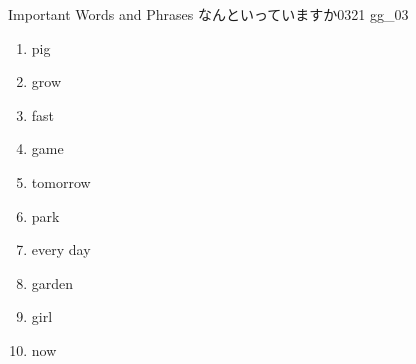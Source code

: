 \documentclass[aspectratio=169,xcolor={dvipsnames,table}]{beamer}
\begin{document}
\begin{frame}[plain,t]{Important Words and Phrases}
  なんといっていますか\hfill{\tiny 0321}\,{\scriptsize {}\,gg\_03}\pause

  \Large
  \begin{enumerate}[<+- |alert@+>]\setlength{\itemsep}{-1.8pt}
    \item pig
    \item grow%
    \item fast
    \item game
    \item tomorrow
    \item park
    \item every day
    \item garden
    \item girl
    \item now
  \end{enumerate}

\end{frame}
\end{document}
